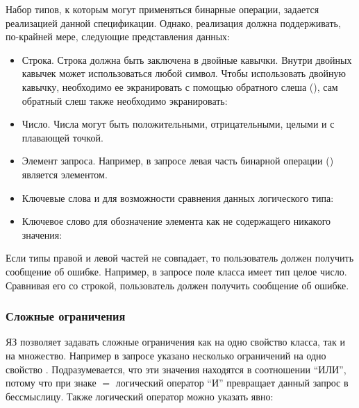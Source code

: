 Набор типов, к которым могут применяться бинарные операции, задается реализацией
данной спецификации. Однако, реализация должна поддерживать, по-крайней мере,
следующие представления данных:
    \begin{itemize}\addtolength{\itemsep}{-0.7\baselineskip}
	\item Строка.
	    Строка должна быть заключена в двойные кавычки. Внутри двойных кавычек может
	    использоваться любой символ. Чтобы использовать двойную кавычку, необходимо
	    ее экранировать с помощью обратного слеша (), сам обратный слеш также
	    необходимо экранировать:

	\item Число. Числа могут быть положительными, отрицательными, целыми и с плавающей точкой.

	\item Элемент запроса. Например, в запросе
	     левая часть бинарной операции () является элементом.
	
	\item Ключевые слова  и  для возможности сравнения данных логического типа:

	\item Ключевое слово  для обозначение элемента как не содержащего никакого значения:

   \end{itemize}

Если типы правой и левой частей не совпадает, то пользователь должен получить сообщение
об ошибке. Например, в запросе
поле  класса  имеет тип целое число. Сравнивая его со строкой,
пользователь должен получить сообщение об ошибке.






\subsubsection{Сложные ограничения}
ЯЗ позволяет задавать сложные ограничения как на одно свойство класса, так и на множество.
Например в запросе
указано несколько ограничений на одно свойство . Подразумевается, что эти значения
находятся в соотношении ``ИЛИ'', потому что при знаке $=$ логический оператор  ``И''
превращает данный запрос в бессмыслицу. Также логический оператор можно указать явно:


